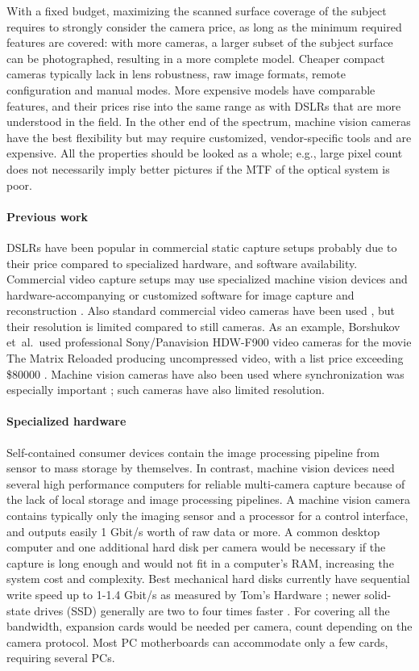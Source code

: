 With a fixed budget, maximizing the scanned surface coverage of the subject requires to strongly consider the camera price, as long as the minimum required features are covered: with more cameras, a larger subset of the subject surface can be photographed, resulting in a more complete model.
Cheaper compact cameras typically lack in lens robustness, raw image formats, remote configuration and manual modes.
More expensive models have comparable features, and their prices rise into the same range as with DSLRs that are more understood in the field.
In the other end of the spectrum, machine vision cameras have the best flexibility but may require customized, vendor-specific tools and are expensive.
All the properties should be looked as a whole; e.g., large pixel count does not necessarily imply better pictures if the MTF of the optical system is poor.

\paragraph{Previous work}
DSLRs have been popular in commercial static capture setups \cite{ir-ltd,ten24,capturelab,agisoftforum,winder2008technical} probably due to their price compared to specialized hardware, and software availability.
Commercial video capture setups may use specialized machine vision devices and hardware-accompanying or customized software for image capture and reconstruction \cite{al2013new}.
Also standard commercial video cameras have been used \cite{bradley2010high}, but their resolution is limited compared to still cameras.
As an example, Borshukov et~al.\ used professional Sony/Panavision HDW-F900 video cameras for the movie The Matrix Reloaded \cite{borshukov05universal} producing uncompressed video, with a list price exceeding \$80000 \cite{sonyhdwf900r}.
Machine vision cameras have also been used where synchronization was especially important \cite{carceroni2002multi,bickel2007multi}; such cameras have also limited resolution.

\paragraph{Specialized hardware}
Self-contained consumer devices contain the image processing pipeline from sensor to mass storage by themselves.
In contrast, machine vision devices need several high performance computers for reliable multi-camera capture because of the lack of local storage and image processing pipelines.
A machine vision camera contains typically only the imaging sensor and a processor for a control interface, and outputs easily 1 Gbit/s worth of raw data or more.
A common desktop computer and one additional hard disk per camera would be necessary if the capture is long enough and would not fit in a computer's RAM, increasing the system cost and complexity.
Best mechanical hard disks currently have sequential write speed up to 1-1.4 Gbit/s as measured by Tom's Hardware \cite{tomshw-hddwrite};
newer solid-state drives (SSD) generally are two to four times faster \cite{tomshw-ssdwrite}.
For covering all the bandwidth, expansion cards would be needed per camera, count depending on the camera protocol.
Most PC motherboards can accommodate only a few cards, requiring several PCs.

